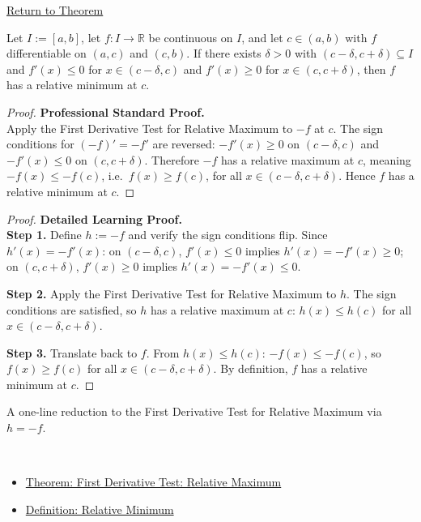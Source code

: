 \newpage
{}
\label{prf:first-derivative-test-minimum}

\begin{remark*}[Return]
\hyperref[thm:first-derivative-test-minimum]{Return to Theorem}
\end{remark*}

\begin{theorem*}
Let $I := [a,b]$, let $f : I \to \mathbb{R}$ be continuous on $I$, and let $c \in (a,b)$ with $f$ differentiable on $(a,c)$ and $(c,b)$. If there exists $\delta > 0$ with $(c-\delta,c+\delta) \subseteq I$ and $f'(x) \leq 0$ for $x \in (c-\delta,c)$ and $f'(x) \geq 0$ for $x \in (c,c+\delta)$, then $f$ has a relative minimum at $c$.
\end{theorem*}

\begin{proof}
\textbf{Professional Standard Proof.}~\\
Apply the First Derivative Test for Relative Maximum to $-f$ at $c$. The sign conditions for $(-f)'= -f'$ are reversed: $-f'(x) \geq 0$ on $(c-\delta,c)$ and $-f'(x) \leq 0$ on $(c,c+\delta)$. Therefore $-f$ has a relative maximum at $c$, meaning $-f(x) \leq -f(c)$, i.e.\ $f(x) \geq f(c)$, for all $x \in (c-\delta,c+\delta)$. Hence $f$ has a relative minimum at $c$.
\end{proof}

\begin{proof}
\textbf{Detailed Learning Proof.}~\\

\textbf{Step 1.} Define $h := -f$ and verify the sign conditions flip. Since $h'(x) = -f'(x)$: on $(c-\delta,c)$, $f'(x) \leq 0$ implies $h'(x) = -f'(x) \geq 0$; on $(c,c+\delta)$, $f'(x) \geq 0$ implies $h'(x) = -f'(x) \leq 0$.

\textbf{Step 2.} Apply the First Derivative Test for Relative Maximum to $h$. The sign conditions are satisfied, so $h$ has a relative maximum at $c$: $h(x) \leq h(c)$ for all $x \in (c-\delta,c+\delta)$.

\textbf{Step 3.} Translate back to $f$. From $h(x) \leq h(c)$: $-f(x) \leq -f(c)$, so $f(x) \geq f(c)$ for all $x \in (c-\delta,c+\delta)$. By definition, $f$ has a relative minimum at $c$.
\end{proof}

\begin{remark*}
A one-line reduction to the First Derivative Test for Relative Maximum via $h = -f$.
\end{remark*}

\begin{remark*}[Dependencies]~\\
\begin{itemize}
  \item \hyperref[thm:first-derivative-test-maximum]{Theorem: First Derivative Test: Relative Maximum}
  \item \hyperref[def:relative-minimum]{Definition: Relative Minimum}
\end{itemize}
\end{remark*}
